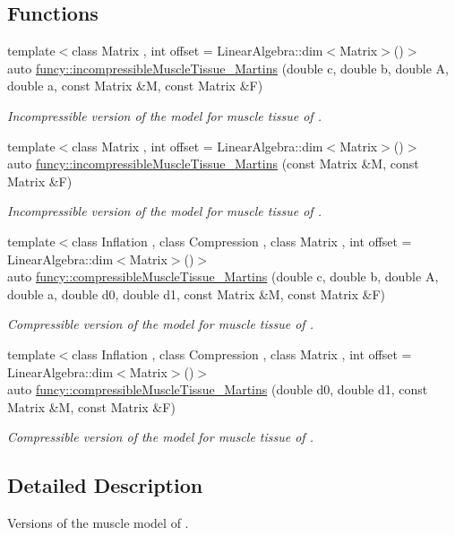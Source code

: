 \subsection*{Functions}
\begin{DoxyCompactItemize}
\item 
{\footnotesize template$<$class Matrix , int offset = Linear\-Algebra\-::dim$<$\-Matrix$>$()$>$ }\\auto \hyperlink{group__Biomechanics_gaeaaf9e9eccfecfa8503cdf4dbb393e21}{funcy\-::incompressible\-Muscle\-Tissue\-\_\-\-Martins} (double c, double b, double A, double a, const Matrix \&M, const Matrix \&F)
\begin{DoxyCompactList}\small\item\em Incompressible version of the model for muscle tissue of \cite{Martins1998}. \end{DoxyCompactList}\item 
{\footnotesize template$<$class Matrix , int offset = Linear\-Algebra\-::dim$<$\-Matrix$>$()$>$ }\\auto \hyperlink{group__Biomechanics_ga84c71caab50eced9ca7e6d3d323c57e1}{funcy\-::incompressible\-Muscle\-Tissue\-\_\-\-Martins} (const Matrix \&M, const Matrix \&F)
\begin{DoxyCompactList}\small\item\em Incompressible version of the model for muscle tissue of \cite{Martins1998}. \end{DoxyCompactList}\item 
{\footnotesize template$<$class Inflation , class Compression , class Matrix , int offset = Linear\-Algebra\-::dim$<$\-Matrix$>$()$>$ }\\auto \hyperlink{group__Biomechanics_gabe40c595a6752c8cbd8680123f984734}{funcy\-::compressible\-Muscle\-Tissue\-\_\-\-Martins} (double c, double b, double A, double a, double d0, double d1, const Matrix \&M, const Matrix \&F)
\begin{DoxyCompactList}\small\item\em Compressible version of the model for muscle tissue of \cite{Martins1998}. \end{DoxyCompactList}\item 
{\footnotesize template$<$class Inflation , class Compression , class Matrix , int offset = Linear\-Algebra\-::dim$<$\-Matrix$>$()$>$ }\\auto \hyperlink{group__Biomechanics_ga073cb35106dcb176a580bab290bc8422}{funcy\-::compressible\-Muscle\-Tissue\-\_\-\-Martins} (double d0, double d1, const Matrix \&M, const Matrix \&F)
\begin{DoxyCompactList}\small\item\em Compressible version of the model for muscle tissue of \cite{Martins1998}. \end{DoxyCompactList}\end{DoxyCompactItemize}


\subsection{Detailed Description}
Versions of the muscle model of \cite{Martins1998}. 